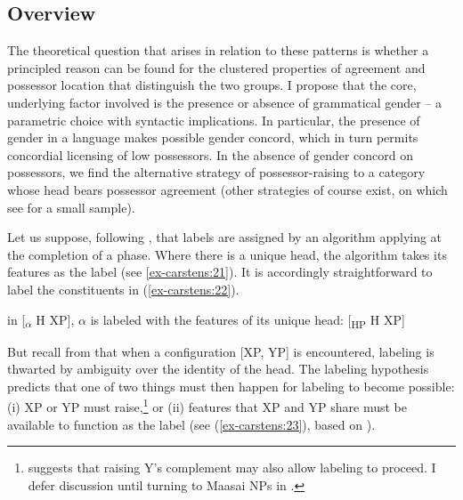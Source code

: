 \documentclass[output=paper
,modfonts
,nonflat]{langsci/langscibook}
\begin{document}
\subsection{Overview} \label{sec-carstens:3.1}
The theoretical question that arises in relation to these patterns is whether a principled reason can be found for the clustered properties of agreement and possessor location that distinguish the two groups. I propose that the core, underlying factor involved is the presence or absence of grammatical gender -- a parametric choice with syntactic implications. In particular, the presence of gender in a language makes possible gender concord, which in turn permits concordial licensing of low possessors. In the absence of gender concord on possessors, we find the alternative strategy of possessor-raising to a category whose head bears possessor agreement (other strategies of course exist, on which see  for a small sample). 

Let us suppose, following \citet{Chomsky2013, Chomsky2015}, that labels are assigned by an algorithm applying at the completion of a phase. Where there is a unique head, the algorithm takes its features as the label (see \ref{ex-carstens:21}). It is accordingly straightforward to label the constituents in (\ref{ex-carstens:22}).

\begin{exe}
\ex\label{ex-carstens:21} in [\textsubscript{$\alpha$} H XP], $\alpha$ is labeled with the features of its unique head: [\textsubscript{HP} H XP] 
\end{exe}
\begin{exe}
	\ex\label{ex-carstens:22} 
\end{exe}
But recall from  that when a configuration [XP, YP] is encountered, labeling is thwarted by ambiguity over the identity of the head. The labeling hypothesis predicts that one of two things must then happen for labeling to become possible: (i) XP or YP must raise,\footnote{\citet{Chomsky2015} suggests that raising Y’s complement may also allow labeling to proceed. I defer discussion until turning to Maasai NPs in .}  or (ii) features that XP and YP share must be available to function as the label (see  (\ref{ex-carstens:23}), based on \citealt[44]{Chomsky2013}).
\end{document}
